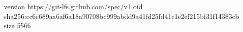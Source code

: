 version https://git-lfs.github.com/spec/v1
oid sha256:cc6e689aa6af6a18a90708bc999abdd9a41fd25fd41c1e2ef215bf31f14383eb
size 5566
